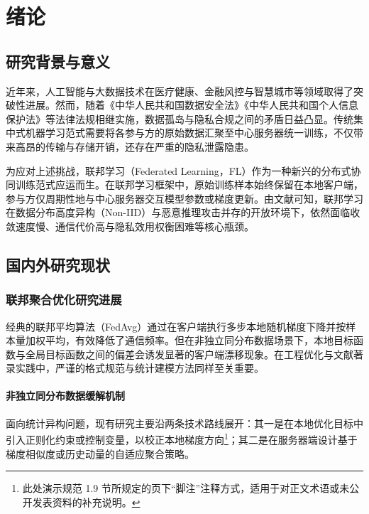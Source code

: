 
\chapter{绪论}

\section{研究背景与意义}

近年来，人工智能与大数据技术在医疗健康、金融风控与智慧城市等领域取得了突破性进展。然而，随着《中华人民共和国数据安全法》《中华人民共和国个人信息保护法》等法律法规相继实施，数据孤岛与隐私合规之间的矛盾日益凸显。传统集中式机器学习范式需要将各参与方的原始数据汇聚至中心服务器统一训练，不仅带来高昂的传输与存储开销，还存在严重的隐私泄露隐患。

为应对上述挑战，联邦学习（Federated Learning，FL）作为一种新兴的分布式协同训练范式应运而生\cite{mcmahan2017fedavg}。在联邦学习框架中，原始训练样本始终保留在本地客户端，参与方仅周期性地与中心服务器交互模型参数或梯度更新。由文献可知，联邦学习在数据分布高度异构（Non-IID）与恶意推理攻击并存的开放环境下，依然面临收敛速度慢、通信代价高与隐私效用权衡困难等核心瓶颈。

\section{国内外研究现状}

\subsection{联邦聚合优化研究进展}

经典的联邦平均算法（FedAvg）通过在客户端执行多步本地随机梯度下降并按样本量加权平均，有效降低了通信频率\cite{mcmahan2017fedavg}。但在非独立同分布数据场景下，本地目标函数与全局目标函数之间的偏差会诱发显著的客户端漂移现象。在工程优化与文献著录实践中，严谨的格式规范与统计建模方法同样至关重要\cite{chenjianjun2001,gbt7714_2015}。

\subsubsection{非独立同分布数据缓解机制}

面向统计异构问题，现有研究主要沿两条技术路线展开：其一是在本地优化目标中引入正则化约束或控制变量，以校正本地梯度方向\footnote{此处演示规范 1.9 节所规定的页下“脚注”注释方式，适用于对正文术语或未公开发表资料的补充说明。}；其二是在服务器端设计基于梯度相似度或历史动量的自适应聚合策略。

